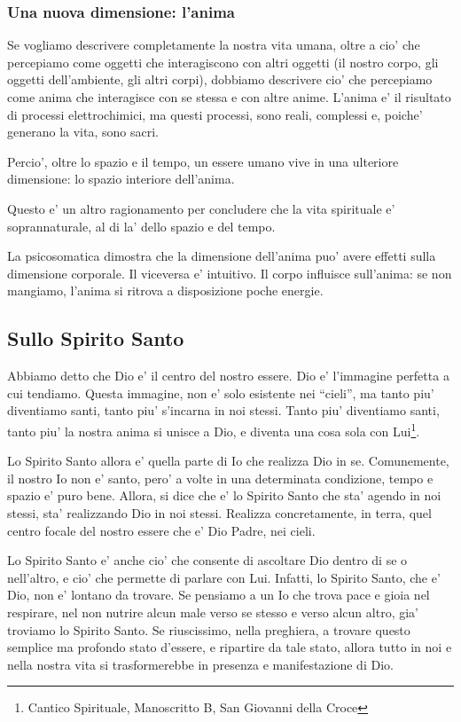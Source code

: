 \subsubsection{Una nuova dimensione: l'anima}
\label{SullaFedeAnima}
Se vogliamo descrivere completamente la nostra vita umana, oltre a cio' che percepiamo come oggetti che interagiscono con altri oggetti (il nostro corpo, gli oggetti dell'ambiente, gli altri corpi), dobbiamo descrivere cio' che percepiamo come anima che interagisce con se stessa e con altre anime. L'anima e' il risultato di processi elettrochimici, ma questi processi, sono reali, complessi e, poiche' generano la vita, sono sacri. 

Percio', oltre lo spazio e il tempo, un essere umano vive in una ulteriore dimensione: lo spazio interiore dell'anima.

Questo e' un altro ragionamento per concludere che la vita spirituale e' soprannaturale, al di la' dello spazio e del tempo.

La psicosomatica dimostra che la dimensione dell'anima puo' avere effetti sulla dimensione corporale. Il viceversa e' intuitivo. Il corpo influisce sull'anima: se non mangiamo, l'anima si ritrova a disposizione poche energie.


\subsection{Sullo Spirito Santo}
Abbiamo detto che Dio e' il centro del nostro essere. Dio e' l'immagine perfetta a cui tendiamo. Questa immagine, non e' solo esistente nei ``cieli'', ma tanto piu' diventiamo santi, tanto piu' s'incarna in noi stessi. Tanto piu' diventiamo santi, tanto piu' la nostra anima si unisce a Dio, e diventa una cosa sola con Lui\footnote{Cantico Spirituale, Manoscritto B, San Giovanni della Croce}.

Lo Spirito Santo allora e' quella parte di Io che realizza Dio in se. Comunemente, il nostro Io non e' santo, pero' a volte in una determinata condizione, tempo e spazio e' puro bene. Allora, si dice che e' lo Spirito Santo che sta' agendo in noi stessi, sta' realizzando Dio in noi stessi. Realizza concretamente, in terra, quel centro focale del nostro essere che e' Dio Padre, nei cieli. 

Lo Spirito Santo e' anche cio' che consente di ascoltare Dio dentro di se o nell'altro, e cio' che permette di parlare con Lui. Infatti, lo Spirito Santo, che e' Dio, non e' lontano da trovare. Se pensiamo a un Io che trova pace e gioia nel respirare, nel non nutrire alcun male verso se stesso e verso alcun altro, gia' troviamo lo Spirito Santo. Se riuscissimo, nella preghiera, a trovare questo semplice ma profondo stato d'essere, e ripartire da tale stato, allora tutto in noi e nella nostra vita si trasformerebbe in presenza e manifestazione di Dio.

